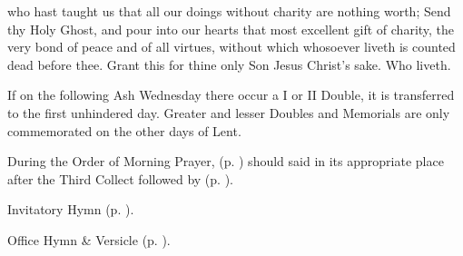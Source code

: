 \collect

 who hast taught us that all our doings without charity are nothing worth; Send thy Holy Ghost, and pour into our hearts that most excellent gift of charity, the very bond of peace and of all virtues, without which whosoever liveth is counted dead before thee. Grant this for thine only Son Jesus Christ's sake. Who liveth.







\begin{rubric}
If on the following Ash Wednesday there occur a I or II Double, it is transferred to the first unhindered day. Greater and lesser Doubles and Memorials are only commemorated on the other days of Lent.	
\end{rubric}




\feastdate{}{}

\mattins

\begin{rubric}
	During the Order of Morning Prayer,  (p. \pageref{litany}) should said in its appropriate place after the Third Collect followed by  (p. \pageref{penitential}).
\end{rubric}

\begin{rubric}
	Invitatory Hymn  (p. \pageref{WednesdayInvitatory}).
\end{rubric}


\begin{rubric}
	Office Hymn \& Versicle  (p. \pageref{WednesdayMattins}).
\end{rubric}

